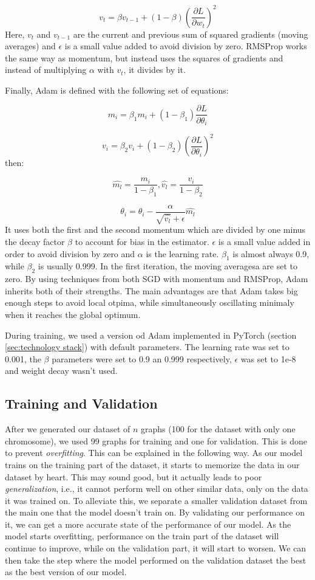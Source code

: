 \documentclass[times, utf8, diplomski, english]{fer_eng}
\begin{document}
\[ v_t = \beta v_{t-1} + (1 - \beta) \left(\frac{\partial L}{\partial w_t}\right)^2 \]
Here, $v_t$ and $v_{t-1}$ are the current and previous sum of squared gradients (moving averages) and $\epsilon$ is a small value added to avoid division by zero. RMSProp works the same way as momentum, but instead uses the squares of gradients and instead of multiplying $\alpha$ with $v_t$, it divides by it.

Finally, Adam is defined with the following set of equations:

\[ m_i = \beta_1 m_i + (1 - \beta_1) \frac{\partial L}{\partial \theta_i} \]


\[ v_i = \beta_2 v_i + (1 - \beta_2) \left(\frac{\partial L}{\partial \theta_i}\right)^2 \]
then:

\[ \widehat{m_l} = \frac{m_i}{1 - \beta_1}, \widehat{v_l} = \frac{v_i}{1 - \beta_2} \]

\[ \theta_i = \theta_i - \frac{\alpha}{\sqrt{\widehat{v_l}} + \epsilon} \widehat{m_l} \]
It uses both the first and the second momentum which are divided by one minus the decay factor $\beta$ to account for bias in the estimator. $\epsilon$ is a small value added in order to avoid division by zero and $\alpha$ is the learning rate. $\beta_1$ is almost always 0.9, while $\beta_2$ is usually 0.999. In the first iteration, the moving averagesa are set to zero. By using techniques from both SGD with momentum and RMSProp, Adam inherits both of their strengths. The main advantages are that Adam takes big enough steps to avoid local otpima, while simultaneously oscillating minimaly when it reaches the global optimum.

During training, we used a version od Adam implemented in PyTorch (section \ref{sec:technology stack}) with default parameters. The learning rate was set to 0.001, the $\beta$ parameters were set to 0.9 an 0.999 respectively, $\epsilon$ was set to 1e-8 and weight decay wasn't used.

\subsection{Training and Validation}
\label{subsec:the training process}

After we generated our dataset of $n$ graphs (100 for the dataset with only one chromosome), we used 99 graphs for training and one for validation. This is done to prevent \textit{overfitting}. This can be explained in the following way. As our model trains on the training part of the dataset, it starts to memorize the data in our dataset by heart. This may sound good, but it actually leads to poor \textit{generalization}, i.e., it cannot perform well on other similar data, only on the data it was trained on. To alleviate this, we separate a smaller validation dataset from the main one that the model doesn't train on. By validating our performance on it, we can get a more accurate state of the performance of our model. As the model starts overfitting, performance on the train part of the dataset will continue to improve, while on the validation part, it will start to worsen. We can then take the step where the model performed on the validation dataset the best as the best version of our model.
\end{document}
